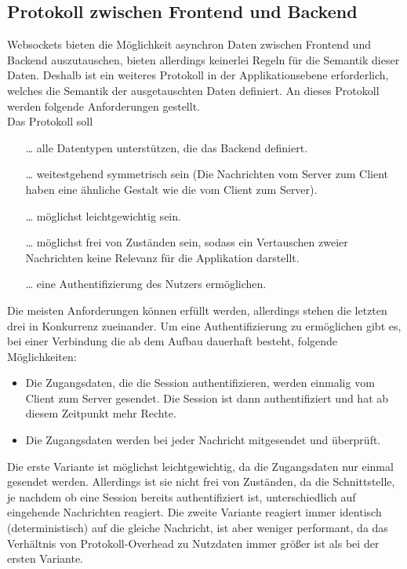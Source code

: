 \subsection{Protokoll zwischen Frontend und Backend}\label{subsec:protokollBackendFrontend}
Websockets bieten die Möglichkeit asynchron Daten zwischen Frontend und Backend auszutauschen, 
bieten allerdings keinerlei Regeln für die Semantik dieser Daten. 
Deshalb ist ein weiteres Protokoll in der Applikationsebene erforderlich, 
welches die Semantik der ausgetauschten Daten definiert. 
An dieses Protokoll werden folgende Anforderungen gestellt.\\
Das Protokoll soll
\begin{itemize}
 \item [\dots]alle Datentypen unterstützen, die das Backend definiert.
 \item [\dots]weitestgehend symmetrisch sein (Die Nachrichten vom Server zum Client haben eine ähnliche Gestalt wie die vom Client zum Server).
 \item [\dots]möglichst leichtgewichtig sein.
 \item [\dots]möglichst frei von Zuständen sein, sodass ein Vertauschen zweier Nachrichten keine Relevanz für die Applikation darstellt.
 \item [\dots]eine Authentifizierung des Nutzers ermöglichen.
\end{itemize}
Die meisten Anforderungen können erfüllt werden, allerdings stehen die letzten drei in Konkurrenz zueinander.
Um eine Authentifizierung zu ermöglichen gibt es, bei einer Verbindung die ab dem Aufbau dauerhaft besteht, folgende Möglichkeiten:
\begin{itemize}
  \item Die Zugangsdaten, die die Session authentifizieren, werden einmalig vom Client zum Server gesendet.
  Die Session ist dann authentifiziert und hat ab diesem Zeitpunkt mehr Rechte.
  \item Die Zugangsdaten werden bei jeder Nachricht mitgesendet und überprüft. 
\end{itemize}
Die erste Variante ist möglichst leichtgewichtig, da die Zugangsdaten nur einmal gesendet werden. 
Allerdings ist sie nicht frei von Zuständen, da die Schnittstelle, je nachdem ob eine Session bereits authentifiziert ist, unterschiedlich auf eingehende Nachrichten reagiert.
Die zweite Variante reagiert immer identisch (deterministisch) auf die gleiche Nachricht, 
ist aber weniger performant, da das Verhältnis von Protokoll-Overhead zu Nutzdaten immer größer ist als bei der ersten Variante.
